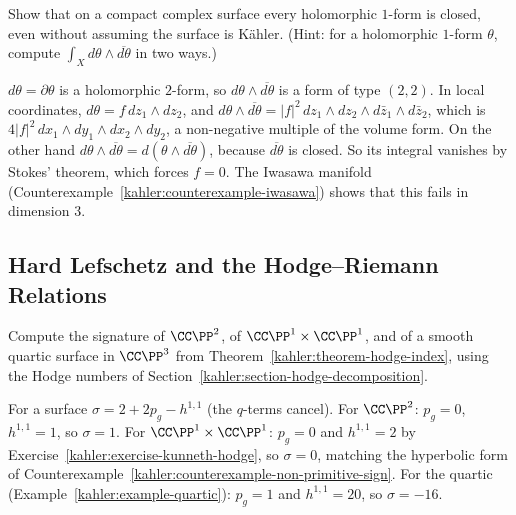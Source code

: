 \begin{exercise}\label{kahler:exercise-holomorphic-closed-surface}
Show that on a compact complex surface every holomorphic $1$-form is closed, even without assuming the surface is K\"ahler.
(Hint: for a holomorphic $1$-form $\theta$, compute $\int_Xd\theta \wedge \overline{d\theta}$ in two ways.)
\end{exercise}

\begin{solution}
$d\theta = \partial\theta$ is a holomorphic $2$-form, so $d\theta \wedge \overline{d\theta}$ is a form of type $(2,2)$. In local
coordinates, $d\theta = f\,dz_1 \wedge dz_2$, and $d\theta \wedge \overline{d\theta} = |f|^2\,dz_1 \wedge dz_2 \wedge d\bar z_1 \wedge d\bar z_2$,
which is $4|f|^2\,dx_1 \wedge dy_1 \wedge dx_2 \wedge dy_2$, a non-negative multiple of the volume form. On the other
hand $d\theta \wedge \overline{d\theta} = d(\theta \wedge \overline{d\theta})$, because $\overline{d\theta}$ is closed. So its integral
vanishes by Stokes' theorem, which forces $f = 0$. The Iwasawa manifold (Counterexample~\ref{kahler:counterexample-iwasawa})
shows that this fails in dimension $3$.
\end{solution}

\subsection{Hard Lefschetz and the Hodge--Riemann Relations}\label{kahler:subsection-exercises-lefschetz-theorems}

\begin{exercise}\label{kahler:exercise-signatures}
Compute the signature of $\CC\PP^2$, of $\CC\PP^1 \times \CC\PP^1$, and of a smooth quartic surface in $\CC\PP^3$ from
Theorem~\ref{kahler:theorem-hodge-index}, using the Hodge numbers of Section~\ref{kahler:section-hodge-decomposition}.
\end{exercise}

\begin{solution}
For a surface $\sigma = 2 + 2p_g - h^{1,1}$ (the $q$-terms cancel). For $\CC\PP^2$: $p_g = 0$, $h^{1,1} = 1$, so $\sigma = 1$. For
$\CC\PP^1 \times \CC\PP^1$: $p_g = 0$ and $h^{1,1} = 2$ by Exercise~\ref{kahler:exercise-kunneth-hodge}, so $\sigma = 0$, matching the
hyperbolic form of Counterexample~\ref{kahler:counterexample-non-primitive-sign}. For the quartic (Example~\ref{kahler:example-quartic}):
$p_g = 1$ and $h^{1,1} = 20$, so $\sigma = -16$.
\end{solution}

